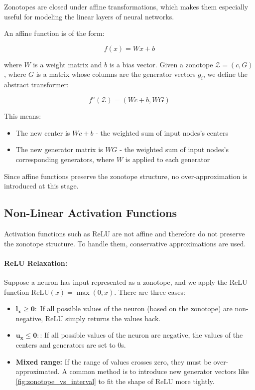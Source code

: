 \documentclass[oneside,11pt,dvipsnames]{book}
\begin{document}
Zonotopes are closed under affine transformations, which makes them especially useful for modeling the linear layers of neural networks.

An affine function is of the form:

\[
f(x) = W x + b
\]

where \(W\) is a weight matrix and \(b\) is a bias vector. Given a zonotope \(\mathcal{Z} = (c, G)\), where \(G\) is a matrix whose columns are the generator vectors \(g_i\), we define the abstract transformer:

\[
f^a(\mathcal{Z}) = (Wc + b, WG)
\]

This means:
\begin{itemize}
    \item The new center is \(Wc + b\) - the weighted sum of input nodes's centers
    \item The new generator matrix is \(WG\) - the weighted sum of input nodes's corresponding generators, where \(W\) is applied to each generator 
\end{itemize}

Since affine functions preserve the zonotope structure, no over-approximation is introduced at this stage.

\subsection{Non-Linear Activation Functions}

Activation functions such as ReLU are not affine and therefore do not preserve the zonotope structure. To handle them, conservative approximations are used.

\paragraph{ReLU Relaxation:} Suppose a neuron has input represented as a zonotope, and we apply the ReLU function \(\text{ReLU}(x) = \max(0, x)\). There are three cases:

\begin{itemize}
    \item \(\mathbf{l_x \geq 0:}\) If all possible values of the neuron (based on the zonotope) are non-negative, ReLU simply returns the values back.
    \item  \(\mathbf{u_x \leq 0:}\): If all possible values of the neuron are negative, the values of the centers and generators are set to 0s.
    \item \textbf{Mixed range:} If the range of values crosses zero, they must be over-approximated. A common method is to introduce new generator vectors like \ref{fig:zonotope_vs_interval} to fit the shape of ReLU more tightly.
\end{itemize}
\end{document}
